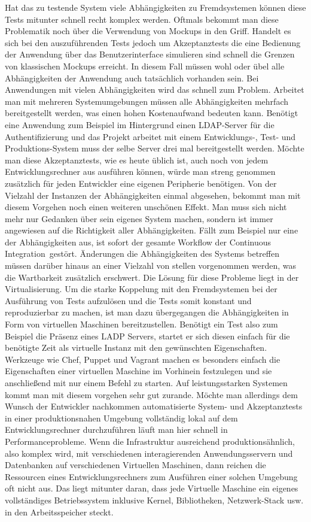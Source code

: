 Hat das zu testende System viele Abhängigkeiten zu Fremdsystemen können diese Tests mitunter schnell recht komplex werden. Oftmals bekommt man diese Problematik noch über die Verwendung von Mockups in den Griff. Handelt es sich bei den auszuführenden Tests jedoch um Akzeptanztests die eine Bedienung der Anwendung über das Benutzerinterface simulieren sind schnell die Grenzen von klassischen Mockups erreicht.
In diesem Fall müssen wohl oder übel alle Abhängigkeiten der Anwendung auch tatsächlich vorhanden sein. Bei Anwendungen mit vielen Abhängigkeiten wird das schnell zum Problem.
Arbeitet man mit mehreren Systemumgebungen müssen alle Abhängigkeiten mehrfach bereitgestellt werden, was einen hohen Kostenaufwand bedeuten kann.
Benötigt eine Anwendung zum Beispiel im Hintergrund einen LDAP-Server für die Authentifizierung und das Projekt arbeitet mit einem Entwicklungs-, Test- und Produktions-System muss der selbe Server drei mal bereitgestellt werden.
Möchte man diese Akzeptanztests, wie es heute üblich ist, auch noch von jedem Entwicklungsrechner aus ausführen können, würde man streng genommen zusätzlich für jeden Entwickler eine eigenen Peripherie benötigen.
Von der Vielzahl der Instanzen der Abhängigkeiten einmal abgesehen, bekommt man mit diesem Vorgehen noch einen weiteren unschönen Effekt.
Man muss sich nicht mehr nur Gedanken über sein eigenes System machen, sondern ist immer angewiesen auf die Richtigkeit aller Abhängigkeiten.
Fällt zum Beispiel nur eine der Abhängigkeiten aus, ist sofort der gesamte Workflow der \grq Continuous Integration\grq\ gestört.
Änderungen die Abhängigkeiten des Systems betreffen müssen darüber hinaus an einer Vielzahl von stellen vorgenommen werden, was die Wartbarkeit zusätzlich erschwert.
Die Lösung für diese Probleme liegt in der Virtualisierung.
Um die starke Koppelung mit den Fremdsystemen bei der Ausführung von Tests aufzulösen und die Tests somit konstant und reproduzierbar zu machen, ist man dazu übergegangen die Abhängigkeiten in Form von virtuellen Maschinen bereitzustellen.
Benötigt ein Test also zum Beispiel die Präsenz eines LADP Servers, startet er sich diesen einfach für die benötigte Zeit als virtuelle Instanz mit den gewünschten Eigenschaften.
Werkzeuge wie Chef, Puppet und Vagrant machen es besonders einfach die Eigenschaften einer virtuellen Maschine im Vorhinein festzulegen und sie anschließend mit nur einem Befehl zu starten.
Auf leistungsstarken Systemen kommt man mit diesem vorgehen sehr gut zurande. Möchte man allerdings dem Wunsch der Entwickler nachkommen automatisierte System- und Akzeptanztests in einer produktionsnahen Umgebung vollständig lokal auf dem Entwicklungsrechner durchzuführen läuft man hier schnell in Performanceprobleme.
Wenn die Infrastruktur \glqq ausreichend produktionsähnlich, also komplex wird, mit verschiedenen interagierenden Anwendungsservern und Datenbanken auf verschiedenen Virtuellen Maschinen, dann reichen die Ressourcen eines Entwicklungsrechners zum Ausführen einer solchen Umgebung oft nicht aus. Das liegt mitunter daran, dass jede Virtuelle Maschine ein eigenes vollständiges Betriebssystem inklusive Kernel, Bibliotheken, Netzwerk-Stack usw. in den Arbeitsspeicher steckt.\grqq \cite{holbreich_von_2014}

